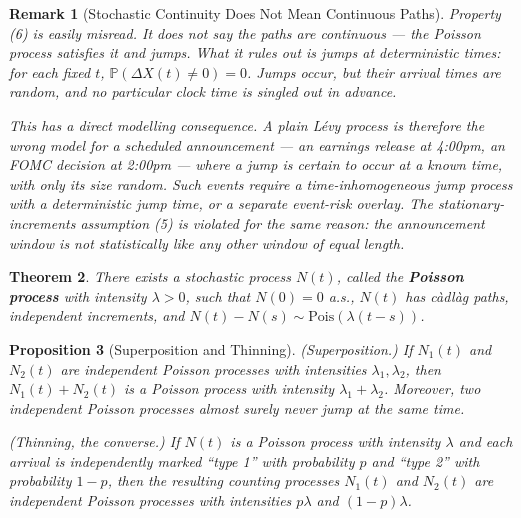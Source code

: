 \documentclass{report}
\theoremstyle{spacedplain}
\newtheorem{theorem}{Theorem}[section]
\newtheorem{proposition}[theorem]{Proposition}
\theoremstyle{spaceddefinition}
\theoremstyle{spacedremark}
\newtheorem{remark}[theorem]{Remark}
\begin{document}
\begin{remark}[Stochastic Continuity Does Not Mean Continuous Paths]
Property (6) is easily misread. It does \emph{not} say the paths are continuous --- the Poisson process satisfies it and jumps. What it rules out is jumps at \emph{deterministic} times: for each \emph{fixed} $t$, $\mathbb{P}(\Delta X(t) \neq 0) = 0$. Jumps occur, but their arrival times are random, and no particular clock time is singled out in advance.

This has a direct modelling consequence. A plain L\'evy process is therefore the \emph{wrong} model for a scheduled announcement --- an earnings release at 4:00pm, an FOMC decision at 2:00pm --- where a jump is certain to occur at a known time, with only its size random. Such events require a time-inhomogeneous jump process with a deterministic jump time, or a separate event-risk overlay. The stationary-increments assumption (5) is violated for the same reason: the announcement window is not statistically like any other window of equal length.
\end{remark}

\begin{theorem}
There exists a stochastic process $N(t)$, called the \textbf{Poisson process} with intensity $\lambda > 0$, such that $N(0) = 0$ a.s., $N(t)$ has c\`adl\`ag paths, independent increments, and $N(t) - N(s) \sim \text{Pois}(\lambda(t-s))$.
\end{theorem}

\begin{proposition}[Superposition and Thinning]
\emph{(Superposition.)} If $N_1(t)$ and $N_2(t)$ are independent Poisson processes with intensities $\lambda_1, \lambda_2$, then $N_1(t) + N_2(t)$ is a Poisson process with intensity $\lambda_1 + \lambda_2$. Moreover, two independent Poisson processes almost surely never jump at the same time.

\emph{(Thinning, the converse.)} If $N(t)$ is a Poisson process with intensity $\lambda$ and each arrival is independently marked ``type 1'' with probability $p$ and ``type 2'' with probability $1-p$, then the resulting counting processes $N_1(t)$ and $N_2(t)$ are \emph{independent} Poisson processes with intensities $p\lambda$ and $(1-p)\lambda$.
\end{proposition}
\end{document}
